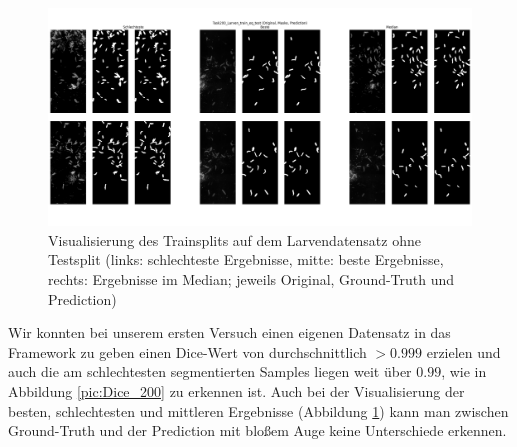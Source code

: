 \begin{figure}[H]
\centering
\includegraphics[height=0.35\textheight, width=\textwidth]{Pictures/nnUnet/Praxis/Task200-Larven-nur-train/Vis-Train.png}
\caption{Visualisierung des Trainsplits auf dem Larvendatensatz ohne Testsplit (links: schlechteste Ergebnisse, mitte: beste Ergebnisse, rechts: Ergebnisse im Median; jeweils Original, Ground-Truth und Prediction)}
\label{pic:Vis-Train_200}

\end{figure}
Wir konnten bei unserem ersten Versuch einen eigenen Datensatz in das Framework zu geben einen Dice-Wert von durchschnittlich $> 0.999$ erzielen und auch die am schlechtesten segmentierten Samples liegen weit über $0.99$, wie in Abbildung \ref{pic:Dice_200} zu erkennen ist.
Auch bei der Visualisierung der besten, schlechtesten und mittleren Ergebnisse (Abbildung \ref{pic:Vis-Train_200}) kann man zwischen Ground-Truth und der Prediction mit bloßem Auge keine Unterschiede erkennen.
